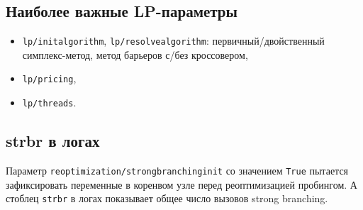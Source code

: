 \documentclass[%
	11pt,
	a4paper,
	utf8,
		]{article}
\begin{document}
\subsection{Наиболее важные LP-параметры}

\begin{itemize}
	\item \verb|lp/initalgorithm|, \verb|lp/resolvealgorithm|: первичный/двойственный симплекс-метод, метод барьеров с/без кроссовером,
	
	\item \verb|lp/pricing|,
	
	\item \verb|lp/threads|.
\end{itemize}

\subsection{strbr в логах}

Параметр \verb|reoptimization/strongbranchinginit| со значением \verb|True| пытается зафиксировать переменные в коренвом узле перед реоптимизацией пробингом. А стоблец \verb|strbr| в логах показывает общее число вызовов strong branching.
\end{document}
